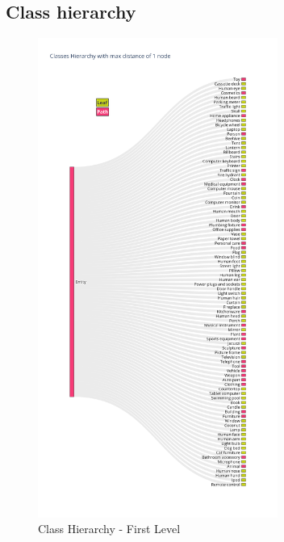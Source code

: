 \documentclass[11pt, a4paper, twocolumn]{article}
\begin{document}
\begin{appendices}
	\section {Class hierarchy}
	\label{sec:appendix-a}
	
	\begin{figure}[ht]
		\centering
		\includegraphics[width=0.7\textwidth]{lvl1_classes.png}
		\caption{\scriptsize Class Hierarchy - First Level}
	\end{figure}
	

\end{appendices}
\end{document}
